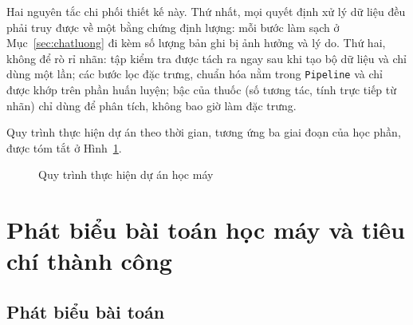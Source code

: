 \documentclass[12pt,a4paper,oneside]{report}
\begin{document}
Hai nguyên tắc chi phối thiết kế này. Thứ nhất, mọi quyết định xử lý dữ
liệu đều phải truy được về một bằng chứng định lượng: mỗi bước làm sạch ở
Mục~\ref{sec:chatluong} đi kèm số lượng bản ghi bị ảnh hưởng và lý do. Thứ hai,
không để rò rỉ nhãn: tập kiểm tra được tách ra ngay sau khi tạo bộ dữ
liệu và chỉ dùng một lần; các bước lọc đặc trưng, chuẩn hóa nằm trong
\texttt{Pipeline} và chỉ được khớp trên phần huấn luyện; bậc của thuốc (số tương
tác, tính trực tiếp từ nhãn) chỉ dùng để phân tích, không bao giờ làm đặc trưng.

Quy trình thực hiện dự án theo thời gian, tương ứng ba giai đoạn của học phần,
được tóm tắt ở Hình~\ref{fig:quytrinh}.

\begin{figure}[H]
  \centering
  \caption{Quy trình thực hiện dự án học máy}
  \label{fig:quytrinh}
\end{figure}

\section{Phát biểu bài toán học máy và tiêu chí thành công}
\label{sec:phatbieu}

\subsection{Phát biểu bài toán}
\end{document}
